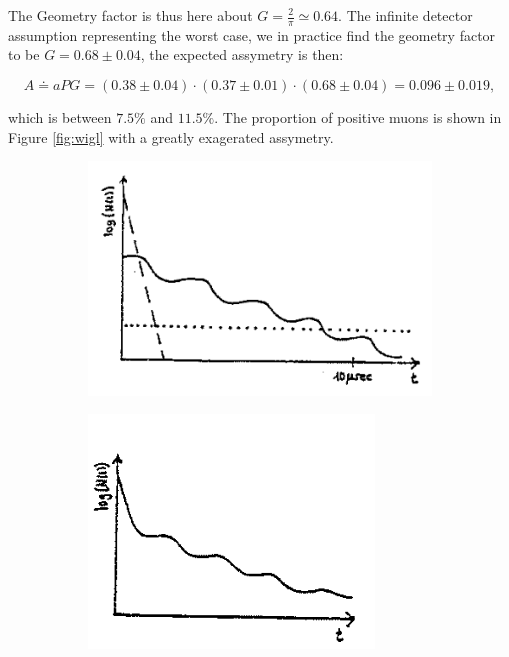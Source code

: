 \begin{enumerate}
The Geometry factor is thus here about $G=\frac{2}{\pi}\simeq 0.64$. The infinite detector assumption representing the worst case, we in practice find the geometry factor to be $G=0.68\pm0.04$, the expected assymetry is then:

\begin{equation}
A \doteq aPG = (0.38 \pm 0.04) \cdot (0.37\pm 0.01) \cdot (0.68 \pm 0.04) = 0.096 \pm 0.019,
\end{equation}

which is between $7.5\%$ and $11.5\%$. The proportion of positive muons is shown in Figure \ref{fig:wigl} with a greatly exagerated assymetry.

\begin{figure}
\centering
   \begin{subfigure}[t]{0.49\linewidth}
  \centering
   \includegraphics[width=\linewidth]{./fig/wigl1.png}
  \caption{}
\label{sfig:wigl1}
  \end{subfigure}
   \begin{subfigure}[t]{0.49\linewidth}
  \centering
   \includegraphics[width=\linewidth]{./fig/wigl2.png}

\end{subfigure}
\end{figure}
\end{enumerate}
